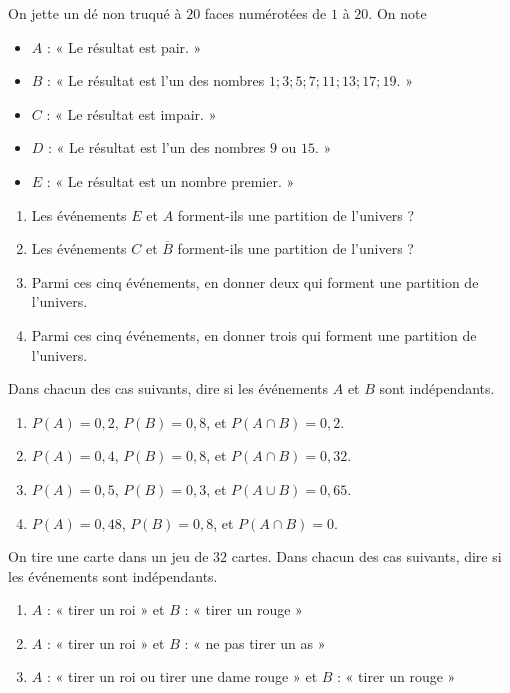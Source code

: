 \documentclass[11pt]{article}
\begin{document}
\begin{exo}
On jette un dé non truqué à $20$ faces numérotées de $1$
à $20$. On note
\begin{itemize}
  \item $A$ : « Le résultat est pair. »
  \item $B$ : « Le résultat est l'un des nombres $1; 3; 5; 7; 11; 13; 17; 19$. »
  \item $C$ : « Le résultat est impair. »
  \item $D$ : « Le résultat est l'un des nombres $9$ ou $15$. »
  \item $E$ : « Le résultat est un nombre premier. »
\end{itemize}
\begin{enumerate}
  \item Les événements $E$ et $A$ forment-ils une partition de l'univers ?
  \item Les événements $C$ et $\overline B$ forment-ils une partition de l'univers ?
  \item Parmi ces cinq événements, en donner deux qui forment une partition de
    l'univers.
  \item Parmi ces cinq événements, en donner trois qui forment une partition de
    l'univers.
\end{enumerate}
\end{exo}

\begin{exo}
Dans chacun des cas suivants, dire si les événements
$A$ et $B$ sont indépendants.
\begin{enumerate}
  \item $P(A)=0,2$, $P(B)=0,8$, et $P(A\cap B)=0,2$.
  \item $P(A)=0,4$, $P(B)=0,8$, et $P(A\cap B)=0,32$.
  \item $P(A)=0,5$, $P(B)=0,3$, et $P(A\cup B)=0,65$.
  \item $P(A)=0,48$, $P(B)=0,8$, et $P(A\cap B)=0$.
\end{enumerate}
\end{exo}

\begin{exo}
On tire une carte dans un jeu de $32$ cartes. Dans
chacun des cas suivants, dire si les événements sont indépendants.
\begin{enumerate}
  \item $A$ : « tirer un roi » et $B$ : « tirer un rouge »
  \item $A$ : « tirer un roi » et $B$ : « ne pas tirer un as »
  \item $A$ : « tirer un roi ou tirer une dame rouge » et $B$ : « tirer un rouge »
\end{enumerate}
\end{exo}
\end{document}
